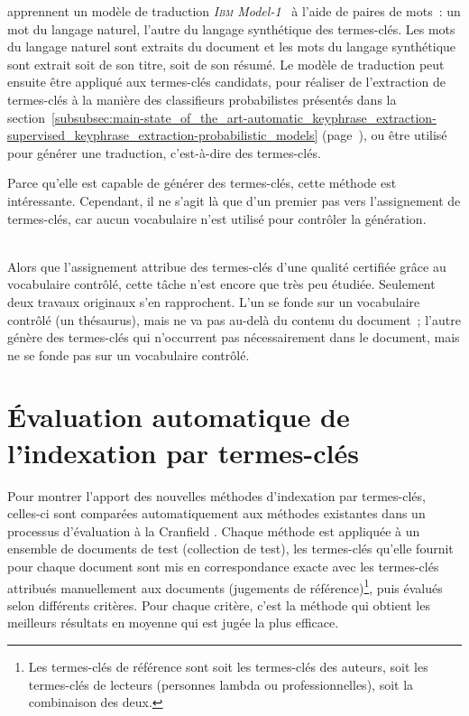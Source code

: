     apprennent un modèle de traduction
    \textit{\textsc{Ibm} Model-1}~\cite{brown1993ibmmodel1} à l'aide de paires
    de mots~: un mot du langage naturel, l'autre du langage synthétique des
    termes-clés. Les mots du langage naturel sont extraits du document et les
    mots du langage synthétique sont extrait soit de son titre, soit de son
    résumé. Le modèle de traduction peut ensuite être appliqué aux termes-clés
    candidats, pour réaliser de l'extraction de termes-clés à la manière des
    classifieurs probabilistes présentés dans la
    section~\ref{subsubsec:main-state_of_the_art-automatic_keyphrase_extraction-supervised_keyphrase_extraction-probabilistic_models}
    (page~\pageref{subsubsec:main-state_of_the_art-automatic_keyphrase_extraction-supervised_keyphrase_extraction-probabilistic_models}),
    ou être utilisé pour générer une traduction, c'est-à-dire des termes-clés.

    Parce qu'elle est capable de générer des termes-clés, cette méthode est
    intéressante. Cependant, il ne s'agit là que d'un premier pas vers
    l'assignement de termes-clés, car aucun vocabulaire n'est utilisé pour
    contrôler la génération.

    ~\\Alors que l'assignement attribue des termes-clés d'une qualité certifiée
    grâce au vocabulaire contrôlé, cette tâche n'est encore que très peu
    étudiée. Seulement deux travaux originaux s'en rapprochent. L'un se fonde
    sur un vocabulaire contrôlé (un thésaurus), mais ne va pas au-delà du
    contenu du document~; l'autre génère des termes-clés qui n'occurrent pas
    nécessairement dans le document, mais ne se fonde pas sur un vocabulaire
    contrôlé.


  \section{Évaluation automatique de l'indexation par termes-clés}
  \label{sec:main-state_of_the_art-automatic_evaluation_of_keyphrase_annotation}
    Pour montrer l'apport des nouvelles méthodes d'indexation par termes-clés,
    celles-ci sont comparées automatiquement aux méthodes existantes dans un
    processus d'évaluation \og{}à la Cranfield\fg{}
    \citep{voorhees2002philosophy}. Chaque méthode est appliquée à un ensemble
    de documents de test (collection de test), les termes-clés qu'elle fournit
    pour chaque document sont mis en correspondance \og{}exacte\fg{} avec les
    termes-clés attribués manuellement aux documents (jugements de
    référence)\footnote{Les termes-clés de référence sont soit les termes-clés
    des auteurs, soit les termes-clés de lecteurs (personnes lambda ou
    professionnelles), soit la combinaison des deux.}, puis évalués selon
    différents critères. Pour chaque critère, c'est la méthode qui obtient les
    meilleurs résultats en moyenne qui est jugée la plus efficace.
  

